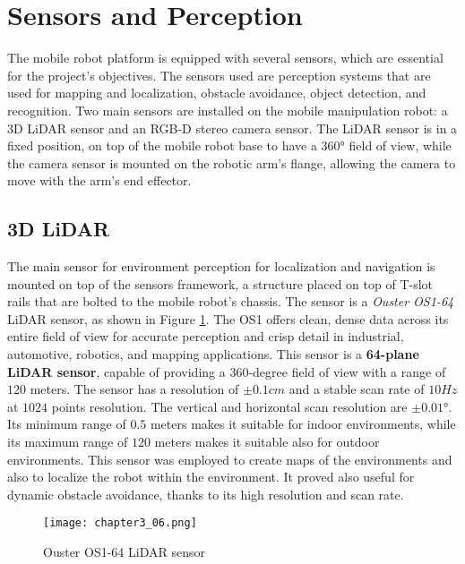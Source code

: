 \section{Sensors and Perception}

The mobile robot platform is equipped with several sensors, which are essential for the project's
objectives. The sensors used are perception systems that are used for mapping and localization, 
obstacle avoidance, object detection, and recognition.
Two main sensors are installed on the mobile manipulation robot: a 3D LiDAR sensor and an RGB-D stereo camera sensor.
The LiDAR sensor is in a fixed position, on top of the mobile robot base to have a 360° field of view, while the camera sensor
is mounted on the robotic arm's flange, allowing the camera to move with the arm's end effector.

\subsection{3D LiDAR}

The main sensor for environment perception for localization and navigation is mounted on top of the sensors
framework, a structure placed on top of T-slot rails that are bolted to the mobile robot's chassis.
The sensor is a \textit{Ouster OS1-64} LiDAR sensor, as shown in Figure \ref{fig:c3_img06}.
The OS1 offers clean, dense data across its entire field of view for accurate perception and crisp detail in industrial,
automotive, robotics, and mapping applications.
This sensor is a \textbf{64-plane LiDAR sensor}, capable of providing a 360-degree field of view with a range of $120$ meters. 
The sensor has a resolution of $\pm 0.1cm$ and a stable scan rate of $10 Hz$ at $1024$ points resolution.
The vertical and horizontal scan resolution are $\pm 0.01$°.
Its minimum range of $0.5$ meters makes it suitable for indoor environments, while its maximum range of $120$ meters
makes it suitable also for outdoor environments.
This sensor was employed to create maps of the environments and also to localize the robot within the environment.
It proved also useful for dynamic obstacle avoidance, thanks to its high resolution and scan rate.

\begin{figure}[t]
    \centering
    \texttt{[image: chapter3\_06.png]}
    \captionsetup{width=1\linewidth}
    \caption{Ouster OS1-64 LiDAR sensor}
    \label{fig:c3_img06}
\end{figure}

